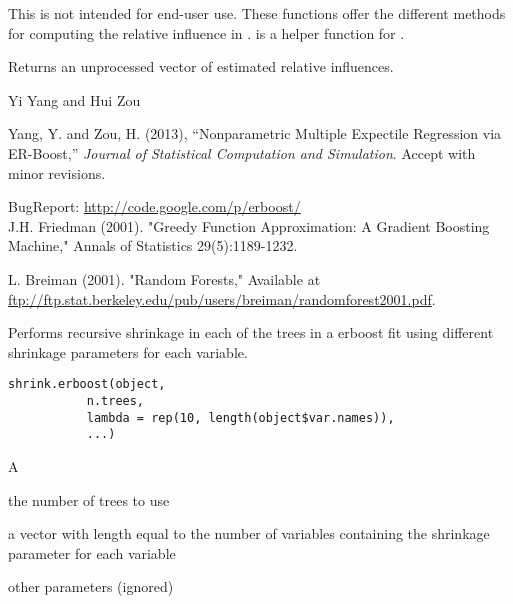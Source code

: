 \documentclass[a4paper]{book}
\begin{document}
%
\begin{Details}\relax
This is not intended for end-user use. These functions offer the different
methods for computing the relative influence in .
 is a helper function for .
\end{Details}
%
\begin{Value}
Returns an unprocessed vector of estimated relative influences.
\end{Value}
%
\begin{Author}\relax
Yi Yang  and Hui Zou 
\end{Author}
%
\begin{References}\relax
Yang, Y. and Zou, H. (2013), ``Nonparametric Multiple Expectile Regression via ER-Boost,'' \emph{Journal of Statistical Computation and Simulation}. Accept with minor revisions.

BugReport: \url{http://code.google.com/p/erboost/}\\{}
J.H. Friedman (2001). "Greedy Function Approximation: A Gradient Boosting
Machine," Annals of Statistics 29(5):1189-1232.

L. Breiman (2001). "Random Forests," Available at \url{ftp://ftp.stat.berkeley.edu/pub/users/breiman/randomforest2001.pdf}.

\end{References}
%
\begin{SeeAlso}\relax
\end{SeeAlso}
%
\begin{Description}\relax
Performs recursive shrinkage in each of the trees in a erboost fit using different shrinkage parameters for each variable.
\end{Description}
%
\begin{Usage}
\begin{verbatim}
shrink.erboost(object, 
           n.trees, 
           lambda = rep(10, length(object$var.names)), 
           ...)
\end{verbatim}
\end{Usage}
%
\begin{Arguments}
\begin{ldescription}
\item[\code{object}]  A  
\item[\code{n.trees}]  the number of trees to use 
\item[\code{lambda}]  a vector with length equal to the number of variables containing the shrinkage parameter for each variable 
\item[\code{...}]  other parameters (ignored) 
\end{ldescription}
\end{Arguments}
\end{document}
